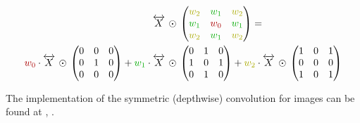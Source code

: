 \begin{equation}
    \label{eq:how-to-compute-symm-conv}
    \begin{split}
        \overleftrightarrow{X} &\,\odot\, \left(\begin{matrix}
            \textcolor{textyellow}{w_2} & \textcolor{textgreen}{w_1} & \textcolor{textyellow}{w_2}\\
            \textcolor{textgreen}{w_1} & \textcolor{textred}{w_0} & \textcolor{textgreen}{w_1}\\
            \textcolor{textyellow}{w_2} & \textcolor{textgreen}{w_1} & \textcolor{textyellow}{w_2}\\
        \end{matrix}\right) = \\
        \textcolor{textred}{w_0}\cdot \overleftrightarrow{X} \,\odot\, \left(\begin{matrix}
            0&0&0\\
            0&1&0\\
            0&0&0\\
        \end{matrix}\right)+
        \textcolor{textgreen}{w_1}\cdot \overleftrightarrow{X} &\,\odot\, \left(\begin{matrix}
            0&1&0\\
            1&0&1\\
            0&1&0\\
        \end{matrix}\right)+
        \textcolor{textyellow}{w_2}\cdot \overleftrightarrow{X} \,\odot\, \left(\begin{matrix}
            1&0&1\\
            0&0&0\\
            1&0&1\\
        \end{matrix}\right)
    \end{split}
\end{equation}


The implementation of the symmetric (depthwise) convolution for images can be found at \cite{selfComputerScience}, .